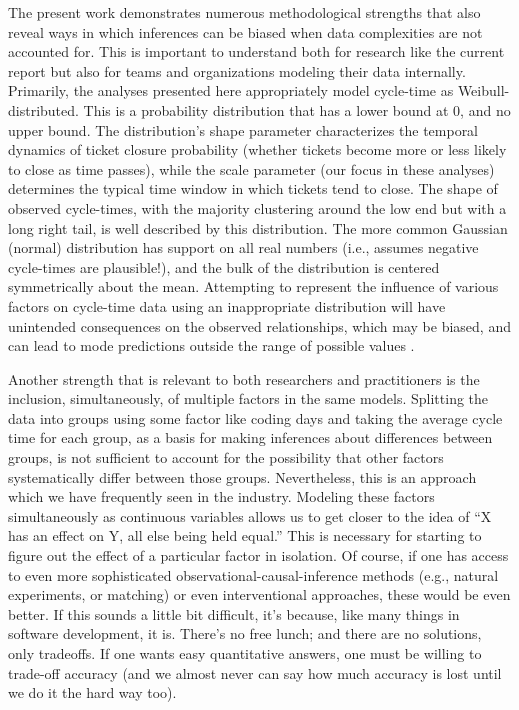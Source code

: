 \documentclass[manuscript,screen,review]{acmart}
\begin{document}
The present work demonstrates numerous methodological strengths that
also reveal ways in which inferences can be biased when data
complexities are not accounted for. This is important to understand both
for research like the current report but also for teams and
organizations modeling their data internally. Primarily, the analyses
presented here appropriately model cycle-time as Weibull-distributed.
This is a probability distribution that has a lower bound at 0, and no
upper bound. The distribution's shape parameter characterizes the
temporal dynamics of ticket closure probability (whether tickets become
more or less likely to close as time passes), while the scale parameter
(our focus in these analyses) determines the typical time window in
which tickets tend to close. The shape of observed cycle-times, with the
majority clustering around the low end but with a long right tail, is
well described by this distribution. The more common Gaussian (normal)
distribution has support on all real numbers (i.e., assumes negative
cycle-times are plausible!), and the bulk of the distribution is
centered symmetrically about the mean. Attempting to represent the
influence of various factors on cycle-time data using an inappropriate
distribution will have unintended consequences on the observed
relationships, which may be biased, and can lead to mode predictions
outside the range of possible values
\citep{collettModellingSurvivalData1994, lawlessStatisticalModelsMethods2003, mcelreathStatisticalRethinkingBayesian2020, nelsonAppliedLifeData1982}.

Another strength that is relevant to both researchers and practitioners
is the inclusion, simultaneously, of multiple factors in the same
models. Splitting the data into groups using some factor like coding
days and taking the average cycle time for each group, as a basis for
making inferences about differences between groups, is not sufficient to
account for the possibility that other factors systematically differ
between those groups. Nevertheless, this is an approach which we have
frequently seen in the industry. Modeling these factors simultaneously
as continuous variables allows us to get closer to the idea of ``X has
an effect on Y, all else being held equal.'' This is necessary for
starting to figure out the effect of a particular factor in isolation.
Of course, if one has access to even more sophisticated
observational-causal-inference methods (e.g., natural experiments, or
matching) or even interventional approaches, these would be even better.
If this sounds a little bit difficult, it's because, like many things in
software development, it is. There's no free lunch; and there are no
solutions, only tradeoffs. If one wants easy quantitative answers, one
must be willing to trade-off accuracy (and we almost never can say how
much accuracy is lost until we do it the hard way too).
\end{document}
